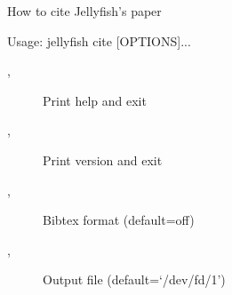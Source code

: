 How to cite Jellyfish's paper

Usage: jellyfish cite [OPTIONS]...

\begin{description}
\item[,] Print help and exit
\item[,] Print version and exit
\item[,] Bibtex format  (default=off)
\item[,] Output file  (default=`/dev/fd/1')
\end{description}
